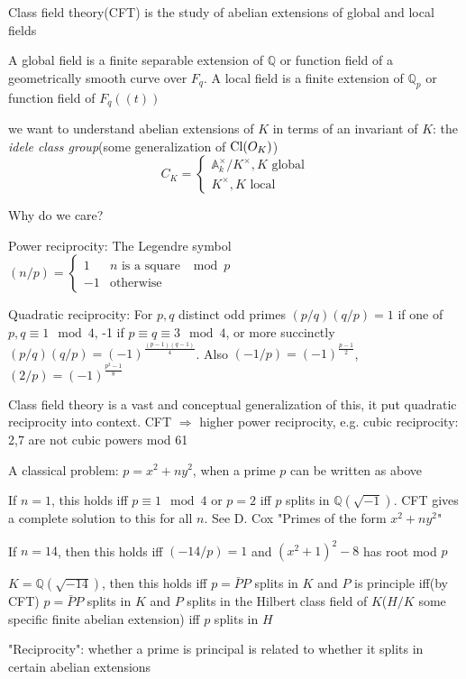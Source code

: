 \documentclass[main]{subfiles}
\begin{document}
Class field theory(CFT) is the study of abelian extensions of global and local fields

\begin{definition}
A global field is a finite separable extension of $\mathbb Q$ or function field of a geometrically smooth curve over $F_q$. A local field is a finite extension of $\mathbb Q_p$ or function field of $F_q((t))$
\end{definition}

we want to understand abelian extensions of $K$ in terms of an invariant of $K$: the \textit{idele class group}(some generalization of $\operatorname{Cl}(O_K)$)
\[C_K=\begin{cases}
\mathbb A^\times_k/K^\times, K\text{ global} \\
K^\times, K\text{ local}
\end{cases}\]

Why do we care?

Power reciprocity: The Legendre symbol $(n/p)=\begin{cases}
1&\text{$n$ is a square $\mod p$}\\
-1&\text{otherwise}
\end{cases}$

Quadratic reciprocity: For $p,q$ distinct odd primes
$(p/q)(q/p)=1$ if one of $p,q\equiv1\mod4$, -1 if $p\equiv q\equiv 3\mod4$, or more succinctly
$(p/q)(q/p)=(-1)^{\frac{(p-1)(q-1)}{4}}$. Also $(-1/p)=(-1)^{\frac{p-1}{2}}$, $(2/p)=(-1)^{\frac{p^2-1}{8}}$


Class field theory is a vast and conceptual generalization of this, it put quadratic reciprocity into context. CFT $\Rightarrow$ higher power reciprocity, e.g. cubic reciprocity: 2,7 are not cubic powers mod 61

A classical problem: $p=x^2+ny^2$, when a prime $p$ can be written as above

If $n=1$, this holds iff $p\equiv 1\mod 4$ or $p=2$ iff $p$ splits in $\mathbb Q(\sqrt{-1})$. CFT gives a complete solution to this for all $n$. See D. Cox "Primes of the form $x^2+ny^2$"

If $n=14$, then this holds iff $(-14/p)=1$ and $(x^2+1)^2-8$ has root mod $p$

$K=\mathbb Q(\sqrt{-14})$, then this holds iff $p=\bar PP$ splits in $K$ and $P$ is principle iff(by CFT) $p=\bar P P$ splits in $K$ and $P$ splits in the Hilbert class field of $K$($H/K$ some specific finite abelian extension) iff $p$ splits in $H$

"Reciprocity": whether a prime is principal is related to whether it splits in certain abelian extensions
\end{document}
